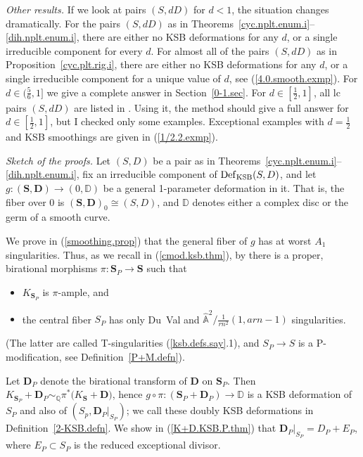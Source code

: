 \documentclass{amsart}
\theoremstyle{definition}
\theoremstyle{remark}
\renewcommand{\a}[0]{\hat{\mathbb A}}
\newcommand{\dd}[0]{{\mathbb D}}
\newcommand{\q}[0]{{\mathbb Q}}
\newcommand{\simq}[0]{\sim_{\q}}
\newcommand{\defsp}[0]{\operatorname{Def}}
\begin{document}
{\it Other results.} 
If we  look at pairs $(S, dD)$ for  $d<1$, the situation changes dramatically. For the pairs $(S, dD)$ as in Theorems~\ref{cyc.nplt.enum.i}--\ref{dih.nplt.enum.i}, there are either no  KSB deformations for any $d$, or a single
irreducible component for every $d$.
For almost all of the pairs $(S, dD)$ as in Proposition~\ref{cyc.plt.rig.i}, there are 
 either no  KSB deformations for any $d$, or a single
 irreducible component for a unique value of  $d$, see (\ref{4.0.smooth.exmp}). For $d\in (\frac56,1]$ we give a complete answer   in Section~\ref{0-1.sec}.
 For $d\in [\frac12,1]$, all lc pairs $(S, dD)$ are listed   in \cite[Sec.3.3]{kk-singbook}. Using it, 
  the method should give a full answer for  $d\in [\frac12,1]$, but I checked  only  some examples. Exceptional examples with $d=\frac12$ and  KSB smoothings are given in (\ref{1/2.2.exmp}).


\medskip




{\it Sketch of the proofs.}
Let $(S, D)$ be a pair as in
Theorems~\ref{cyc.nplt.enum.i}--\ref{dih.nplt.enum.i}, fix  an irreducible component of
  $\defsp_{\rm KSB}(S, D)$,  and let
$g:({\mathbf S}, {\mathbf D})\to  (0,\dd)$
be a general 1-parameter deformation in it. That is,  the fiber over $0$ is
 $({\mathbf S}, {\mathbf D})_0\cong (S, D)$, and $\dd$ denotes either a complex disc or the germ of a smooth curve.

 We prove in (\ref{smoothing.prop}) that the general fiber of $g$ has at worst $A_1$ singularities.  Thus, as we recall in (\ref{cmod.ksb.thm}), by \cite[3.5]{ksb} there is a 
proper, birational morphisms $\pi:{\mathbf S}_P\to {\mathbf S}$ such that
 \begin{itemize}
 \item $K_{{\mathbf S}_P}$ is $\pi$-ample, and
   \item the central fiber 
 $S_P$ has only  Du~Val and $\a^2/\tfrac1{rn^2}(1, arn{-}1)$  singularities.
 \end{itemize}
 (The latter are called T-singularities  (\ref{ksb.defs.say}.1), and
 $S_P\to S$ is a 
   P-modification, see   Definition~\ref{P+M.defn}).
 
 Let ${\mathbf D}_P$ denote the birational transform of ${\mathbf D}$ on
 ${\mathbf S}_P$.  Then
 $K_{{\mathbf S}_P}+{\mathbf D}_P\simq \pi^*\bigl(K_{{\mathbf S}}+{\mathbf D}\bigr)$, hence 
 $g\circ\pi:({\mathbf S}_P+{\mathbf D}_P)\to \dd$
 is a KSB deformation of $S_P$ and also of   $(S_p, {\mathbf D}_P|_{S_P})$;
 we call these doubly KSB deformations  in Definition~\ref{2-KSB.defn}.
 We show in (\ref{K+D.KSB.P.thm}) that ${\mathbf D}_P|_{S_P}=D_P+E_P$, where
 $E_P\subset S_P$ is the reduced exceptional divisor.
\end{document}
